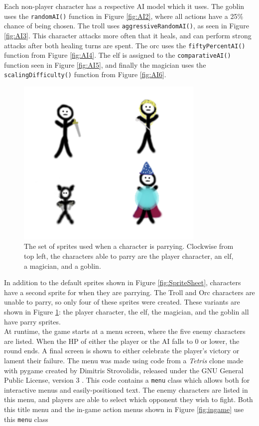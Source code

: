 Each non-player character has a respective AI model which it uses. The goblin uses the \texttt{randomAI()} function in Figure \ref{fig:AI2}, where all actions have a 25\% chance of being chosen. The troll uses \texttt{aggressiveRandomAI()}, as seen in Figure \ref{fig:AI3}. This character attacks more often that it heals, and can perform strong attacks after both healing turns are spent. The orc uses the \texttt{fiftyPercentAI()} function from Figure \ref{fig:AI4}. The elf is assigned to the \texttt{comparativeAI()} function seen in Figure \ref{fig:AI5}, and finally the magician uses the \texttt{scalingDifficulty()} function from Figure \ref{fig:AI6}.

\begin{figure}[H]
  \centering
  \includegraphics[width=9cm]{sprites/ParrySheet.png}
  \caption{The set of sprites used when a character is parrying. Clockwise from top left, the characters able to parry are the player character, an elf, a magician, and a goblin.}
  \label{fig:ParrySheet}
\end{figure}

In addition to the default sprites shown in Figure \ref{fig:SpriteSheet}, characters have a second sprite for when they are parrying. The Troll and Orc characters are unable to parry, so only four of these sprites were created. These variants are shown in Figure \ref{fig:ParrySheet}: the player character, the elf, the magician, and the goblin all have parry sprites.\\

At runtime, the game starts at a menu screen, where the five enemy characters are listed. When the HP of either the player or the AI falls to 0 or lower, the round ends. A final screen is shown to either celebrate the player's victory or lament their failure. The menu was made using code from a \textit{Tetris} clone made with pygame created by Dimitris Strovolidis, released under the GNU General Public License, version 3 \cite{tetris}. This code contains a \texttt{menu} class which allows both for interactive menus and easily-positioned text. The enemy characters are listed in this menu, and players are able to select which opponent they wish to fight. Both this title menu and the in-game action menus shown in Figure \ref{fig:ingame} use this \texttt{menu} class

